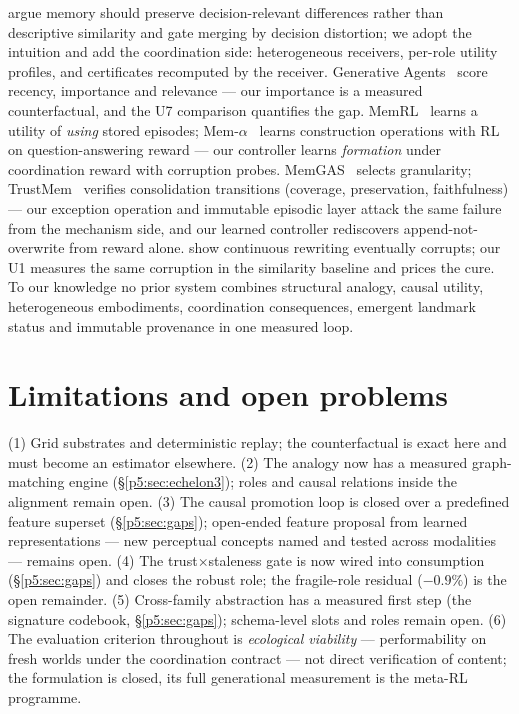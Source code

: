 \documentclass{article}
\begin{document}
\citet{rdd2026} argue memory should preserve decision-relevant
differences rather than descriptive similarity and gate merging by
decision distortion; we adopt the intuition and add the coordination
side: heterogeneous receivers, per-role utility profiles, and
certificates recomputed by the receiver. Generative
Agents~\citep{genagents2023} score recency, importance and relevance
--- our importance is a measured counterfactual, and the U7
comparison quantifies the gap. MemRL~\citep{memrl2026} learns a
utility of \emph{using} stored episodes; Mem-$\alpha$~\citep{memalpha2025}
learns construction operations with RL on question-answering reward
--- our controller learns \emph{formation} under coordination reward
with corruption probes. MemGAS~\citep{memgas2025} selects granularity;
TrustMem~\citep{trustmem2026} verifies consolidation transitions
(coverage, preservation, faithfulness) --- our exception operation
and immutable episodic layer attack the same failure from the
mechanism side, and our learned controller rediscovers
append-not-overwrite from reward alone. \citet{faulty2026} show
continuous rewriting eventually corrupts; our U1 measures the same
corruption in the similarity baseline and prices the cure. To our
knowledge no prior system combines structural analogy, causal
utility, heterogeneous embodiments, coordination consequences,
emergent landmark status and immutable provenance in one measured
loop.

\section{Limitations and open problems}
\label{p5:sec:limits}

(1) Grid substrates and deterministic replay; the counterfactual is
exact here and must become an estimator elsewhere. (2) The analogy now has a measured graph-matching engine
(\S\ref{p5:sec:echelon3}); roles and causal relations inside the
alignment remain open. (3) The causal
promotion loop is closed over a predefined feature superset
(\S\ref{p5:sec:gaps}); open-ended feature proposal from learned
representations --- new perceptual concepts named and tested across
modalities --- remains open. (4) The trust$\times$staleness gate is now wired into consumption
(\S\ref{p5:sec:gaps}) and closes the robust role; the fragile-role
residual ($-0.9\%$) is the open remainder. (5) Cross-family
abstraction has a measured first step (the signature codebook,
\S\ref{p5:sec:gaps}); schema-level slots and roles remain open. (6) The evaluation criterion
throughout is \emph{ecological viability} --- performability on fresh
worlds under the coordination contract --- not direct verification of
content; the formulation is closed, its full generational measurement
is the meta-RL programme.
\end{document}
